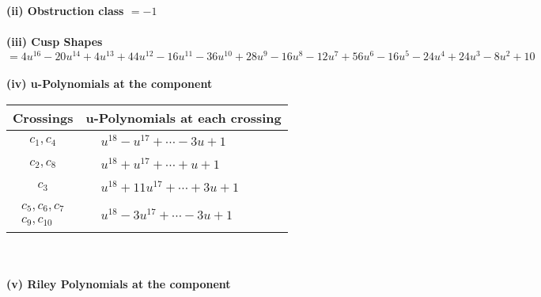\documentclass[1p]{elsarticle_modified}
\theoremstyle{definition}
\begin{document}
\flushleft \textbf{(ii) Obstruction class $= -1$}\\~\\
\flushleft \textbf{(iii) Cusp Shapes $= 4 u^{16}-20 u^{14}+4 u^{13}+44 u^{12}-16 u^{11}-36 u^{10}+28 u^9-16 u^8-12 u^7+56 u^6-16 u^5-24 u^4+24 u^3-8 u^2+10$}\\~\\
\newpage\renewcommand{\arraystretch}{1}
\flushleft \textbf{(iv) u-Polynomials at the component}\newline \\
\begin{tabular}{m{50pt}|m{274pt}}
Crossings & \hspace{64pt}u-Polynomials at each crossing \\
\hline $$\begin{aligned}c_{1},c_{4}\end{aligned}$$&$\begin{aligned}
&u^{18}- u^{17}+\cdots-3 u+1
\end{aligned}$\\
\hline $$\begin{aligned}c_{2},c_{8}\end{aligned}$$&$\begin{aligned}
&u^{18}+u^{17}+\cdots+u+1
\end{aligned}$\\
\hline $$\begin{aligned}c_{3}\end{aligned}$$&$\begin{aligned}
&u^{18}+11 u^{17}+\cdots+3 u+1
\end{aligned}$\\
\hline $$\begin{aligned}c_{5},c_{6},c_{7}\\c_{9},c_{10}\end{aligned}$$&$\begin{aligned}
&u^{18}-3 u^{17}+\cdots-3 u+1
\end{aligned}$\\
\hline
\end{tabular}\\~\\
\newpage\renewcommand{\arraystretch}{1}
\flushleft \textbf{(v) Riley Polynomials at the component}\newline \\
\end{document}
